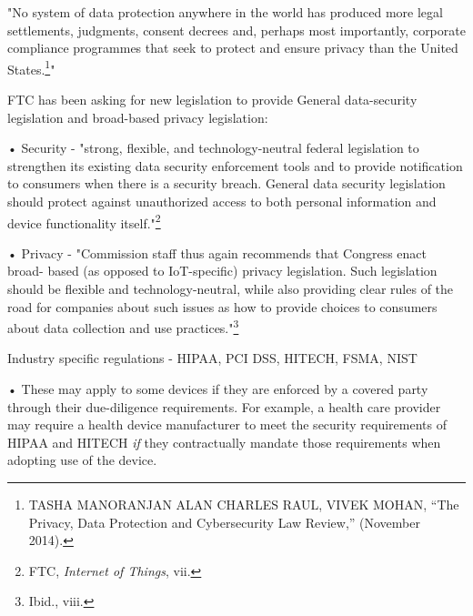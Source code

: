 "No system of data protection anywhere in the world has produced more
legal settlements, judgments, consent decrees and, perhaps most
importantly, corporate compliance programmes that seek to protect and
ensure privacy than the United States.\footnote{TASHA MANORANJAN ALAN
  CHARLES RAUL, VIVEK MOHAN, ``The Privacy, Data Protection and
  Cybersecurity Law Review,'' (November 2014).}"

FTC has been asking for new legislation to provide General data-security
legislation and broad-based privacy legislation:

• Security - "strong, flexible, and technology-neutral federal
legislation to strengthen its existing data security enforcement tools
and to provide notification to consumers when there is a security
breach. General data security legislation should protect against
unauthorized access to both personal information and device
functionality itself."\footnote{FTC, \emph{Internet of Things}, vii.}

• Privacy - "Commission staff thus again recommends that Congress enact
broad- based (as opposed to IoT-specific) privacy legislation. Such
legislation should be flexible and technology-neutral, while also
providing clear rules of the road for companies about such issues as how
to provide choices to consumers about data collection and use
practices."\footnote{Ibid., viii.}

Industry specific regulations - HIPAA, PCI DSS, HITECH, FSMA, NIST

• These may apply to some devices if they are enforced by a covered
party through their due-diligence requirements. For example, a health
care provider may require a health device manufacturer to meet the
security requirements of HIPAA and HITECH \emph{if} they contractually
mandate those requirements when adopting use of the device.